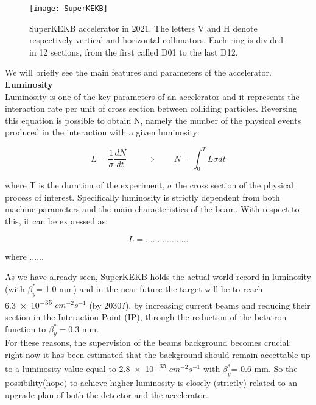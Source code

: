 \begin{figure}[h!]
\centering
\texttt{[image: SuperKEKB]}
\caption{SuperKEKB accelerator in 2021. The letters V and H denote respectively vertical and horizontal collimators. Each ring is divided in 12 sections, from the first called D01 to the last D12.}
\label{fig:superkekb}
\end{figure}

We will briefly see the main features and parameters of the accelerator.\\


\textbf{Luminosity}\\

Luminosity is one of the key parameters of an accelerator and it represents the interaction rate per unit of cross section between colliding particles. Reversing this equation is possible to obtain N, namely the number of the physical events produced in the interaction with a given luminosity:

\begin{equation}
L =\frac{1}{\sigma}\frac{dN}{dt}  \qquad   \Rightarrow \qquad  N = \int_{0}^{T} L\sigma dt
\end{equation}



where T is the duration of the experiment,  $\sigma$ the cross section of the physical process of interest.
Specifically luminosity is strictly dependent from both machine parameters and the main characteristics of the beam. With respect to this, it can be expressed as:

\begin{equation}
L = ..................
\label{luminosity_eq}
\end{equation}

where ......


\hspace{.1cm}
As we have already seen, SuperKEKB holds the actual world record in luminosity (with $\beta^{*}_{y}$= 1.0 mm) and in the near future the target will be to reach \num{6.3e-35} $cm^{-2} s^{-1}$ (by 2030?), by increasing current beams and reducing their section in the Interaction Point (IP), through the reduction of the betatron function to $\beta^{*}_{y}= 0.3$ mm.\\

For these reasons, the supervision of the beams background becomes crucial: right now it has been estimated that the background should remain accettable up to a luminosity value equal to \num{2.8e-35} $cm^{-2} s^{-1}$ with $\beta^{*}_{y}$= 0.6 mm.
So the possibility(hope) to achieve higher luminosity is closely (strictly) related to an upgrade plan of both the detector and the accelerator.

